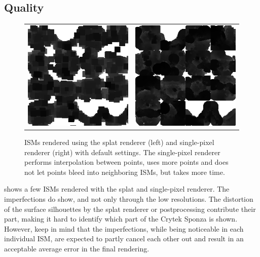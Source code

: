 \subsection{Quality}
\label{sec:results:ism:quality}

\begin{figure}[htb]
\centering
  \begin{tabular}{@{}cc@{}}
    \includegraphics[width=.48\textwidth]{screenshots/ism_splat_cropped} &
    \includegraphics[width=.48\textwidth]{screenshots/ism_single_pixel_cropped}
  \end{tabular}
  \caption{ISMs rendered using the splat renderer (left) and single-pixel renderer (right) with default settings. The single-pixel renderer performs interpolation between points, uses more points and does not let points bleed into neighboring ISMs, but takes more time.}
  \label{fig:results:isms}
\end{figure}

 shows a few ISMs rendered with the splat and single-pixel renderer. The imperfections do show, and not only through the low resolutions. The distortion of the surface silhouettes by the splat renderer or postprocessing contribute their part, making it hard to identify which part of the Crytek Sponza is shown. However, keep in mind that the imperfections, while being noticeable in each individual ISM, are expected to partly cancel each other out and result in an acceptable average error in the final rendering.

